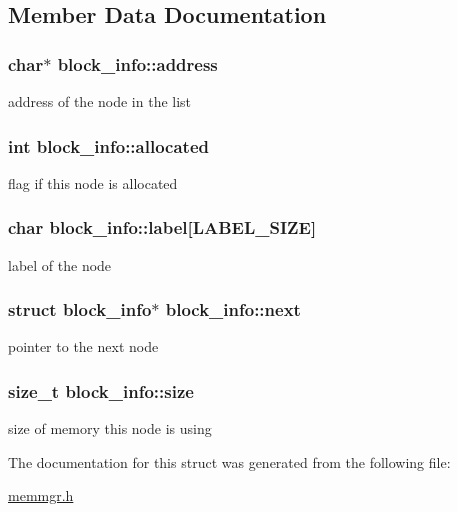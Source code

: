 \subsection{Member Data Documentation}
\hypertarget{structblock__info_a36c04dc53118712a6693cf467076c40e}{
\subsubsection[{address}]{\setlength{\rightskip}{0pt plus 5cm}char$\ast$ block\-\_\-info\-::address}}\label{structblock__info_a36c04dc53118712a6693cf467076c40e}
address of the node in the list \hypertarget{structblock__info_ac7ebfcc525f05b3067a904edd80ba719}{
\subsubsection[{allocated}]{\setlength{\rightskip}{0pt plus 5cm}int block\-\_\-info\-::allocated}}\label{structblock__info_ac7ebfcc525f05b3067a904edd80ba719}
flag if this node is allocated \hypertarget{structblock__info_a798c0e0609ee53eaa87fc617f757ee83}{
\subsubsection[{label}]{\setlength{\rightskip}{0pt plus 5cm}char block\-\_\-info\-::label\mbox{[}{\bf L\-A\-B\-E\-L\-\_\-\-S\-I\-Z\-E}\mbox{]}}}\label{structblock__info_a798c0e0609ee53eaa87fc617f757ee83}
label of the node \hypertarget{structblock__info_a76caf485f1f56802a894c7902612ad22}{
\subsubsection[{next}]{\setlength{\rightskip}{0pt plus 5cm}struct {\bf block\-\_\-info}$\ast$ block\-\_\-info\-::next}}\label{structblock__info_a76caf485f1f56802a894c7902612ad22}
pointer to the next node \hypertarget{structblock__info_abac2385c3bac00c3eb8233dc0b30f7c3}{
\subsubsection[{size}]{\setlength{\rightskip}{0pt plus 5cm}size\-\_\-t block\-\_\-info\-::size}}\label{structblock__info_abac2385c3bac00c3eb8233dc0b30f7c3}
size of memory this node is using 

The documentation for this struct was generated from the following file\-:\begin{DoxyCompactItemize}
\item 
\hyperlink{memmgr_8h}{memmgr.\-h}\end{DoxyCompactItemize}

